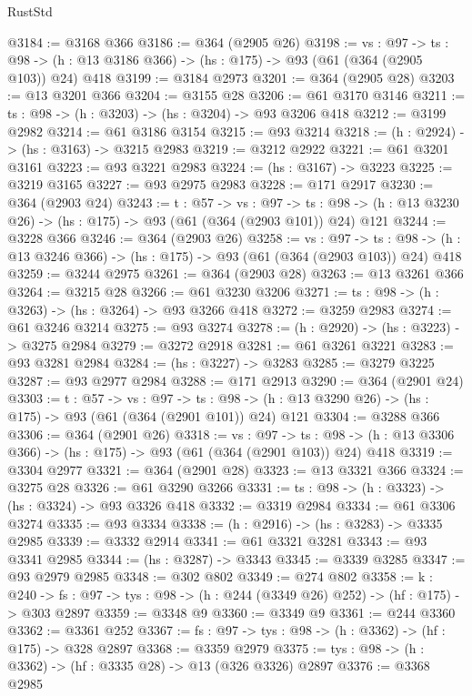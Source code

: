 \begin{lexlean}{RustStd}
\begin{coremodule}
{\begin{coremodule}
{{{{{{{{{@3184 := @3168 @366
@3186 := @364 (@2905 @26)
@3198 := {vs : @97} ->
  {ts : @98} -> (h : @13 @3186 @366) -> (hs : @175) -> @93 (@61 (@364 (@2905 @103)) @24) @418
@3199 := @3184 @2973
@3201 := @364 (@2905 @28)
@3203 := @13 @3201 @366
@3204 := @3155 @28
@3206 := @61 @3170 @3146
@3211 := {ts : @98} -> (h : @3203) -> (hs : @3204) -> @93 @3206 @418
@3212 := @3199 @2982
@3214 := @61 @3186 @3154
@3215 := @93 @3214
@3218 := (h : @2924) -> (hs : @3163) -> @3215 @2983
@3219 := @3212 @2922
@3221 := @61 @3201 @3161
@3223 := @93 @3221 @2983
@3224 := (hs : @3167) -> @3223
@3225 := @3219 @3165
@3227 := @93 @2975 @2983
@3228 := @171 @2917
@3230 := @364 (@2903 @24)
@3243 := {t : @57} ->
  {vs : @97} ->
  {ts : @98} -> (h : @13 @3230 @26) -> (hs : @175) -> @93 (@61 (@364 (@2903 @101)) @24) @121
@3244 := @3228 @366
@3246 := @364 (@2903 @26)
@3258 := {vs : @97} ->
  {ts : @98} -> (h : @13 @3246 @366) -> (hs : @175) -> @93 (@61 (@364 (@2903 @103)) @24) @418
@3259 := @3244 @2975
@3261 := @364 (@2903 @28)
@3263 := @13 @3261 @366
@3264 := @3215 @28
@3266 := @61 @3230 @3206
@3271 := {ts : @98} -> (h : @3263) -> (hs : @3264) -> @93 @3266 @418
@3272 := @3259 @2983
@3274 := @61 @3246 @3214
@3275 := @93 @3274
@3278 := (h : @2920) -> (hs : @3223) -> @3275 @2984
@3279 := @3272 @2918
@3281 := @61 @3261 @3221
@3283 := @93 @3281 @2984
@3284 := (hs : @3227) -> @3283
@3285 := @3279 @3225
@3287 := @93 @2977 @2984
@3288 := @171 @2913
@3290 := @364 (@2901 @24)
@3303 := {t : @57} ->
  {vs : @97} ->
  {ts : @98} -> (h : @13 @3290 @26) -> (hs : @175) -> @93 (@61 (@364 (@2901 @101)) @24) @121
@3304 := @3288 @366
@3306 := @364 (@2901 @26)
@3318 := {vs : @97} ->
  {ts : @98} -> (h : @13 @3306 @366) -> (hs : @175) -> @93 (@61 (@364 (@2901 @103)) @24) @418
@3319 := @3304 @2977
@3321 := @364 (@2901 @28)
@3323 := @13 @3321 @366
@3324 := @3275 @28
@3326 := @61 @3290 @3266
@3331 := {ts : @98} -> (h : @3323) -> (hs : @3324) -> @93 @3326 @418
@3332 := @3319 @2984
@3334 := @61 @3306 @3274
@3335 := @93 @3334
@3338 := (h : @2916) -> (hs : @3283) -> @3335 @2985
@3339 := @3332 @2914
@3341 := @61 @3321 @3281
@3343 := @93 @3341 @2985
@3344 := (hs : @3287) -> @3343
@3345 := @3339 @3285
@3347 := @93 @2979 @2985
@3348 := @302 @802
@3349 := @274 @802
@3358 := {k : @240} ->
  {fs : @97} -> {tys : @98} -> (h : @244 (@3349 @26) @252) -> (hf : @175) -> @303 @2897
@3359 := @3348 @9
@3360 := @3349 @9
@3361 := @244 @3360
@3362 := @3361 @252
@3367 := {fs : @97} -> {tys : @98} -> (h : @3362) -> (hf : @175) -> @328 @2897
@3368 := @3359 @2979
@3375 := {tys : @98} -> (h : @3362) -> (hf : @3335 @28) -> @13 (@326 @3326) @2897
@3376 := @3368 @2985
}}}}}}}}}
\end{coremodule}}
\end{coremodule}
\end{lexlean}
